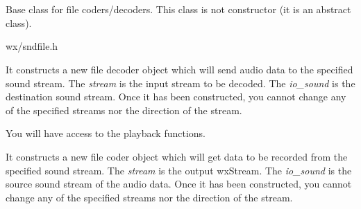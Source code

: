 \section{}\label{wxsoundfilestream}

Base class for file coders/decoders. This class is not constructor (it is an abstract
class).




wx/sndfile.h



\label{wxsoundfilestreamwxsoundfilestream}


It constructs a new file decoder object which will send 
audio data to the specified sound stream. 
The {\it stream} is the input stream to be decoded. The
{\it io\_sound} is the destination sound stream.
Once it has been constructed, you cannot change any of
the specified streams nor the direction of the stream.

You will have access to the playback functions.


It constructs a new file coder object which will get
data to be recorded from the specified sound stream.
The {\it stream} is the output wxStream. The {\it io\_sound}
is the source sound stream of the audio data. Once
it has been constructed, you cannot change any of
the specified streams nor the direction of the stream.

\label{wxsoundfilestreamdtor}

